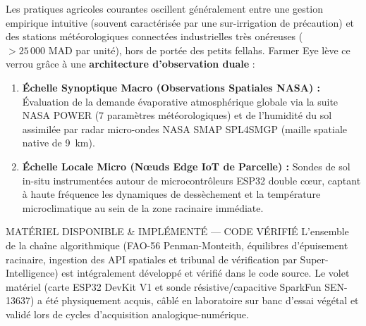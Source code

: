 \documentclass[11pt,a4paper,oneside]{report}
\begin{document}
Les pratiques agricoles courantes oscillent généralement entre une gestion empirique intuitive (souvent caractérisée par une sur-irrigation de précaution) et des stations météorologiques connectées industrielles très onéreuses ($> 25\,000\text{ MAD}$ par unité), hors de portée des petits fellahs. Farmer Eye lève ce verrou grâce à une \textbf{architecture d'observation duale} :
\begin{enumerate}[leftmargin=*]
    \item \textbf{Échelle Synoptique Macro (Observations Spatiales NASA) :} Évaluation de la demande évaporative atmosphérique globale via la suite NASA POWER (7 paramètres météorologiques) et de l'humidité du sol assimilée par radar micro-ondes NASA SMAP SPL4SMGP (maille spatiale native de 9~km).
    \item \textbf{Échelle Locale Micro (Nœuds Edge IoT de Parcelle) :} Sondes de sol in-situ instrumentées autour de microcontrôleurs ESP32 double cœur, captant à haute fréquence les dynamiques de dessèchement et la température microclimatique au sein de la zone racinaire immédiate.
\end{enumerate}

\begin{evidencebox}{MATÉRIEL DISPONIBLE \& IMPLÉMENTÉ — CODE VÉRIFIÉ}
L'ensemble de la chaîne algorithmique (FAO-56 Penman-Monteith, équilibres d'épuisement racinaire, ingestion des API spatiales et tribunal de vérification par Super-Intelligence) est intégralement développé et vérifié dans le code source. Le volet matériel (carte ESP32 DevKit V1 et sonde résistive/capacitive SparkFun SEN-13637) a été physiquement acquis, câblé en laboratoire sur banc d'essai végétal et validé lors de cycles d'acquisition analogique-numérique.
\end{evidencebox}
\end{document}
